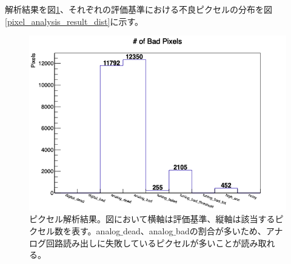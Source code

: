 解析結果を図\ref{pixel_analysis_result}、それぞれの評価基準における不良ピクセルの分布を図\ref{pixel_analysis_result_dist}に示す。

\begin{figure}[bpt]\centering
\includegraphics[width=12cm]{./data/analysis_result/Bad_Pixels.png}
\caption[ピクセル解析結果]{ピクセル解析結果。図において横軸は評価基準、縦軸は該当するピクセル数を表す。analog$\_$dead、analog$\_$badの割合が多いため、アナログ回路読み出しに失敗しているピクセルが多いことが読み取れる。}
\label{pixel_analysis_result}
\end{figure}

